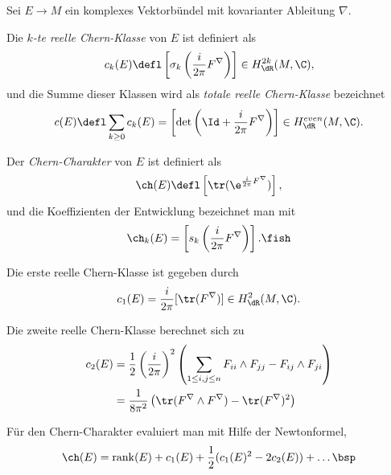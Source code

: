 \documentclass[%
	paper=a5,%
	fleqn,%
	DIV=18,%
	BCOR=0mm,
	fontsize=11pt,
	titlepage=false,%
	bibliography=totoc,
	DIV=18,%
	twoside=true,
	pdftitle=Riemannsche Geometrie,
	pdfauthor=Uwe Semmelmann,
	numbers=noendperiod]%
	{scrbook}
\begin{document}
\begin{defn}
Sei $E\to M$ ein komplexes Vektorbündel mit kovarianter Ableitung $\nabla$.
\begin{defnenum}
\item 
Die \emph{$k$-te reelle Chern-Klasse} von $E$ ist definiert als
\begin{align*}
c_k(E)\defl \left[\sigma_k\left(\frac{i}{2\pi} F^\nabla \right) \right]
\in H^{2k}_{\dR}(M,\C),
\end{align*}
und die Summe dieser Klassen wird als \emph{totale reelle Chern-Klasse}
bezeichnet
\begin{align*}
c(E) \defl \sum_{k\ge 0} c_k(E) = \left[\det\left(\Id + \frac{i}{2\pi}
F^\nabla\right) \right]\in H^{even}_{\dR}(M,\C).
\end{align*}
\item Der \emph{Chern-Charakter} von $E$ ist definiert als
\begin{align*}
\ch(E) \defl \left[\tr(\e^{\frac{i}{2\pi}F^\nabla})\right],
\end{align*}
und die Koeffizienten der Entwicklung bezeichnet man mit
\begin{align*}
\ch_k(E) = \left[s_k\left(\frac{i}{2\pi} F^\nabla\right) \right].\fish
\end{align*}
\end{defnenum}
\end{defn}

\newcommand{\rank}{\mathrm{rank}}

\begin{ex}
\begin{exenum}
\item Die erste reelle Chern-Klasse ist gegeben durch
\begin{align*}
c_1(E) = \frac{i}{2\pi}[\tr(F^\nabla)] \in H_{\dR}^2(M,\C).
\end{align*}
\item Die zweite reelle Chern-Klasse berechnet sich zu
\begin{align*}
c_2(E) &= \frac{1}{2}\left(\frac{i}{2\pi}\right)^2
\left(\sum_{1\le i,j\le n} F_{ii}\wedge F_{jj} - F_{ij} \wedge F_{ji} \right)\\
&= 
\frac{1}{8\pi^2}\left(\tr(F^\nabla\wedge F^\nabla) - \tr(F^\nabla)^2 \right)
\end{align*}
\item Für den Chern-Charakter evaluiert man mit Hilfe der Newtonformel,
\begin{align*}
\ch(E) = \rank(E) + c_1(E)  + \frac{1}{2}(c_1(E)^2 - 2c_2(E)) + \ldots\bsp
\end{align*} 
\end{exenum}
\end{ex}
\end{document}
